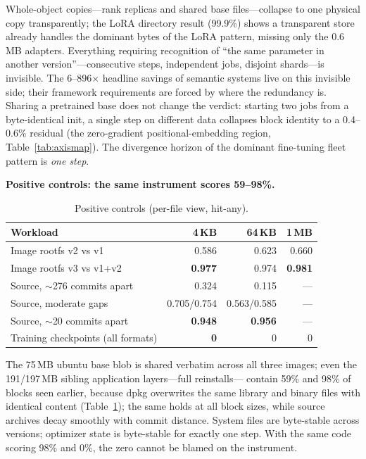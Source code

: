\documentclass[sigconf,10pt,anonymous,review]{acmart}
\begin{document}
Whole-object copies---rank replicas and shared base files---collapse to
one physical copy transparently; the LoRA directory result (99.9\%)
shows a transparent store already handles the dominant bytes of the LoRA
pattern, missing only the 0.6\,MB adapters. Everything requiring
recognition of ``the same parameter in another version''---consecutive
steps, independent jobs, disjoint shards---is invisible. The
6--896$\times$ headline savings of semantic systems live on this
invisible side; their framework requirements are forced by where the
redundancy is. Sharing a pretrained base does not change the verdict:
starting two jobs from a byte-identical init, a single step on different
data collapses block identity to a 0.4--0.6\% residual (the zero-gradient
positional-embedding region, Table~\ref{tab:axismap}). The divergence
horizon of the dominant fine-tuning fleet pattern is \emph{one step}.

\noindent\textbf{Positive controls: the same instrument scores 59--98\%.}

\begin{table}[t]
\caption{Positive controls (per-file view, hit-any).}
\label{tab:controls}
\footnotesize
\setlength{\tabcolsep}{4pt}
\begin{tabular}{p{3.55cm}rrr}
\toprule
\textbf{Workload} & \textbf{4\,KB} & \textbf{64\,KB} & \textbf{1\,MB} \\
\midrule
Image rootfs v2 vs v1 & 0.586 & 0.623 & 0.660 \\
Image rootfs v3 vs v1+v2 & \textbf{0.977} & 0.974 & \textbf{0.981} \\
Source, $\sim$276 commits apart & 0.324 & 0.115 & --- \\
Source, moderate gaps & 0.705/0.754 & 0.563/0.585 & --- \\
Source, $\sim$20 commits apart & \textbf{0.948} & \textbf{0.956} & --- \\
Training checkpoints (all formats) & \textbf{0} & 0 & 0 \\
\bottomrule
\end{tabular}
\end{table}

The 75\,MB ubuntu base blob is shared verbatim across all three images;
even the 191/197\,MB sibling application layers---full reinstalls---
contain 59\% and 98\% of blocks seen earlier, because dpkg overwrites the
same library and binary files with identical content
(Table~\ref{tab:controls}); the same holds at all block sizes, while
source archives decay smoothly with commit distance. System files are
byte-stable across versions; optimizer state is byte-stable for exactly
one step. With the same code scoring 98\% and 0\%, the zero cannot be
blamed on the instrument.
\end{document}
